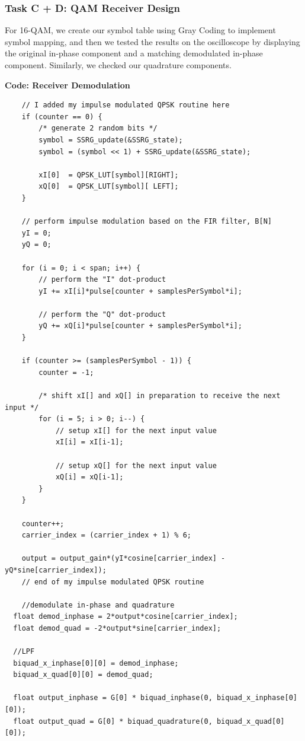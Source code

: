 \documentclass{article}
\begin{document}
\pagebreak

\subsubsection{Task C + D: QAM Receiver Design}
For 16-QAM, we create our symbol table using Gray Coding to implement symbol mapping, and then we tested the results on the oscilloscope by displaying the original in-phase component and a matching demodulated in-phase component. Similarly, we checked our quadrature components.

\textbf{Code: Receiver Demodulation}

\begin{verbatim}
	// I added my impulse modulated QPSK routine here
	if (counter == 0) {
		/* generate 2 random bits */
		symbol = SSRG_update(&SSRG_state); 
		symbol = (symbol << 1) + SSRG_update(&SSRG_state);

		xI[0]  = QPSK_LUT[symbol][RIGHT];  
		xQ[0]  = QPSK_LUT[symbol][ LEFT];   
	}

	// perform impulse modulation based on the FIR filter, B[N]
	yI = 0;
	yQ = 0;

	for (i = 0; i < span; i++) {
		// perform the "I" dot-product
		yI += xI[i]*pulse[counter + samplesPerSymbol*i];	

		// perform the "Q" dot-product
		yQ += xQ[i]*pulse[counter + samplesPerSymbol*i];	
	}

	if (counter >= (samplesPerSymbol - 1)) {
		counter = -1; 

		/* shift xI[] and xQ[] in preparation to receive the next input */
		for (i = 5; i > 0; i--) {
			// setup xI[] for the next input value
			xI[i] = xI[i-1];  

			// setup xQ[] for the next input value
			xQ[i] = xQ[i-1];  
		}
	}

	counter++;
	carrier_index = (carrier_index + 1) % 6;

	output = output_gain*(yI*cosine[carrier_index] - yQ*sine[carrier_index]);
	// end of my impulse modulated QPSK routine

	//demodulate in-phase and quadrature
  float demod_inphase = 2*output*cosine[carrier_index];
  float demod_quad = -2*output*sine[carrier_index];

  //LPF
  biquad_x_inphase[0][0] = demod_inphase;
  biquad_x_quad[0][0] = demod_quad;

  float output_inphase = G[0] * biquad_inphase(0, biquad_x_inphase[0][0]);
  float output_quad = G[0] * biquad_quadrature(0, biquad_x_quad[0][0]);
\end{verbatim}
\end{document}
